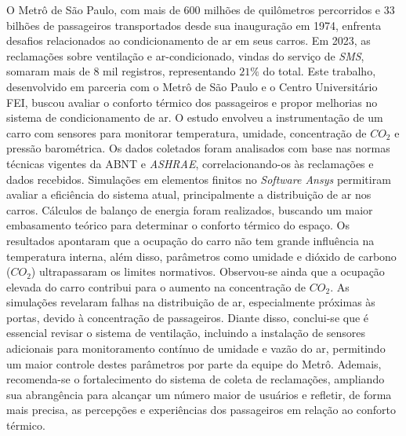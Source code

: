 \documentclass[acronym,symbols,table]{fei}
\begin{document}
\begin{resumo} %

O Metrô de São Paulo, com mais de 600 milhões de quilômetros percorridos e 33 bilhões de passageiros transportados desde sua inauguração em 1974, enfrenta desafios relacionados ao condicionamento de ar em seus carros. Em 2023, as reclamações sobre ventilação e ar-condicionado, vindas do serviço de \textit{SMS}, somaram mais de 8 mil registros, representando $21\%$ do total. Este trabalho, desenvolvido em parceria com o Metrô de São Paulo e o Centro Universitário FEI, buscou avaliar o conforto térmico dos passageiros e propor melhorias no sistema de condicionamento de ar. O estudo envolveu a instrumentação de um carro com sensores para monitorar temperatura, umidade, concentração de ${CO}_{2}$ e pressão barométrica. Os dados coletados foram analisados com base nas normas técnicas vigentes da ABNT e \textit{ASHRAE}, correlacionando-os às reclamações e dados recebidos. Simulações em elementos finitos no \textit{Software Ansys} permitiram avaliar a eficiência do sistema atual, principalmente a distribuição de ar nos carros. Cálculos de balanço de energia foram realizados, buscando um maior embasamento teórico para determinar o conforto térmico do espaço. Os resultados apontaram que a ocupação do carro não tem grande influência na temperatura interna, além disso, parâmetros como umidade e dióxido de carbono (${CO}_{2}$) ultrapassaram os limites normativos. Observou-se ainda que a ocupação elevada do carro contribui para o aumento na concentração de ${CO}_{2}$. As simulações revelaram falhas na distribuição de ar, especialmente próximas às portas, devido à concentração de passageiros. Diante disso, conclui-se que é essencial revisar o sistema de ventilação, incluindo a instalação de sensores adicionais para monitoramento contínuo de umidade e vazão do ar, permitindo um maior controle destes parâmetros por parte da equipe do Metrô. Ademais, recomenda-se o fortalecimento do sistema de coleta de reclamações, ampliando sua abrangência para alcançar um número maior de usuários e refletir, de forma mais precisa, as percepções e experiências dos passageiros em relação ao conforto térmico.



\end{resumo}
\end{document}
